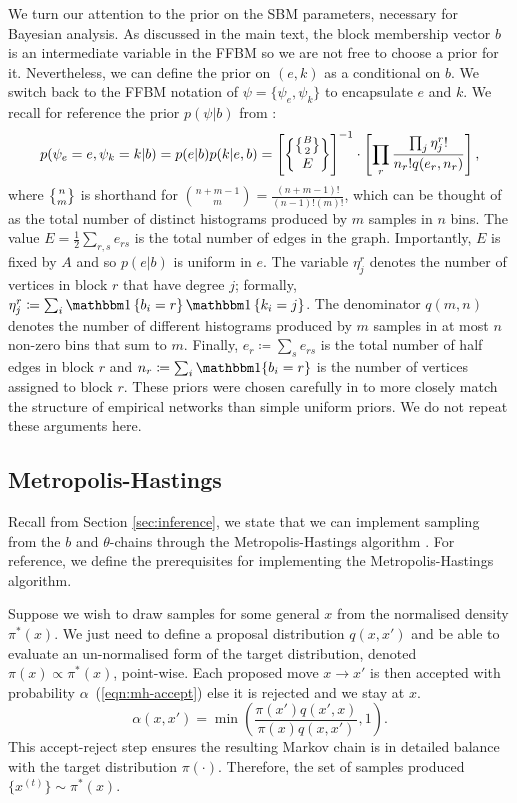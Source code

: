 We turn our attention to the prior on the SBM parameters, necessary for Bayesian analysis. As discussed in the main text, the block membership vector $b$ is an intermediate variable in the FFBM so we are not free to choose a prior for it. Nevertheless, we can define the prior on $(e,k)$ as a conditional on $b$. We switch back to the FFBM notation of $\psi = \{\psi_e, \psi_k\}$ to encapsulate $e$ and $k$. We recall for reference
the prior $p(\psi | b)$ from \cite{Peixoto-Bayesian-Microcanonical}:
%
\begin{equation}
	p(\psi_e=e, \psi_k=k | b) = p(e | b) p(k | e, b) = \left[ \specialchoose{ \specialchoose{B}{2} }{ E} \right]^{-1} 
	\cdot \left[ \prod_r \frac{\prod_j \eta_j^r !}{n_r! q(e_r, n_r)} \right],
\end{equation}
%
where $\specialchoose{n}{m}$ is shorthand 
for $\binom{n+m-1}{m} = \frac{(n+m-1)!}{(n-1)!(m)!}$,
which can be thought of as the total number of distinct histograms 
produced by $m$ samples in $n$ bins.
The value
$E = \frac{1}{2} \sum_{r,s} e_{rs}$ is the total number of edges in the graph. 
Importantly, $E$ is fixed by $A$ and so $p(e|b)$ is uniform in $e$.
The variable $\eta_j^r$ denotes the number of vertices in block $r$ 
that have degree $j$; formally, $\eta_j^r \coloneqq \sum_{i} \one\left\{b_i = r \right\} \one \left\{k_i = j \right\}$. 
The denominator $q(m, n)$ denotes the number of different histograms 
produced by $m$ samples in 
at most $n$ non-zero bins that sum to $m$. 
Finally, $e_r \coloneqq \sum_{s} e_{rs}$ is the total number 
of half edges in block $r$ and $n_r \coloneqq \sum_{i} \one\{b_i = r\}$ 
is the number of vertices assigned to block $r$.
These priors were chosen carefully in \cite{Peixoto-Bayesian-Microcanonical} to 
more closely match the structure of empirical networks than simple 
uniform priors. We do not repeat these arguments here.

\subsection{Metropolis-Hastings}
\label{appdx:metropolis-hastings}

Recall from Section \ref{sec:inference}, we state that we can implement sampling from the $b$ and $\theta$-chains through the Metropolis-Hastings algorithm \cite{hastings-alg}. For reference, we define the prerequisites for implementing the Metropolis-Hastings algorithm.

Suppose we wish to draw samples for some general $x$ from the normalised density $\pi^*(x)$. We just need to define a proposal distribution $q(x, x')$ and be able to evaluate an un-normalised form of the target distribution, denoted $\pi(x) \propto \pi^*(x)$, point-wise. Each proposed move $x \rightarrow x'$ is then accepted with probability $\alpha$~(\ref{eqn:mh-accept}) else it is rejected and we stay at $x$.
%
\begin{equation}
\alpha(x, x') = \min \left( \frac{\pi(x') q(x', x)}{\pi(x) q(x, x')} , 1 \right).
\label{eqn:mh-accept}
\end{equation}
%
This accept-reject step ensures the resulting Markov chain is in detailed balance with the target distribution $\pi(\cdot)$. Therefore, the set of samples produced $\{x^{(t)}\} \sim \pi^*(x)$.

